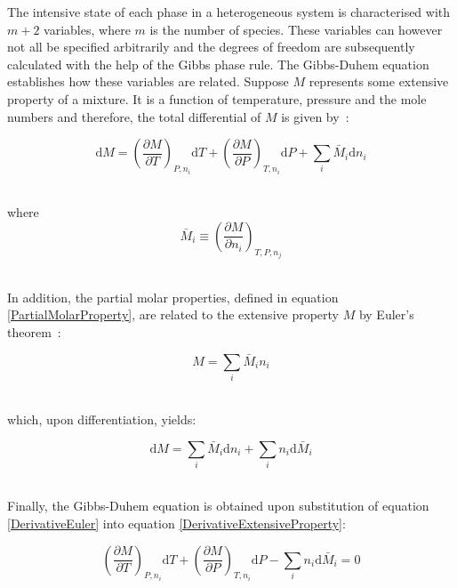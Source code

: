 The intensive state of each phase in a heterogeneous system is characterised with $m+2$ variables, where $m$ is the number of species. These variables can however not all be specified arbitrarily and the degrees of freedom are subsequently calculated with the help of the Gibbs phase rule. The Gibbs-Duhem equation establishes how these variables are related. Suppose $M$ represents some extensive property of a mixture. It is a function of temperature, pressure and the mole numbers and therefore, the total differential of $M$ is given by~\cite{MolecularThermodynamicsOfFluidPhaseEquilibria}:\

\begin{equation}
\mathrm{d}M = \left( \frac{\partial M}{\partial T}\right)_{P, n_{i}} \mathrm{d}T + \left( \frac{\partial M}{\partial P}\right)_{T, n_{i}} \mathrm{d}P + \sum_{i} \bar{M}_{i} \mathrm{d}n_{i} \label{DerivativeExtensiveProperty}
\end{equation}\

where\
\begin{equation}
\bar{M}_{i} \equiv \left(\frac{\partial M}{\partial n_{i}}\right)_{T, P, n_{j}} \label{PartialMolarProperty}
\end{equation}\


In addition, the partial molar properties, defined in equation \ref{PartialMolarProperty}, are related to the extensive property $M$ by Euler's theorem~\cite{MolecularThermodynamicsOfFluidPhaseEquilibria}:\

\begin{equation}
M = \sum_{i} \bar{M}_{i} n_{i} \label{Euler}
\end{equation}\

which, upon differentiation, yields:\

\begin{equation}
\mathrm{d}M = \sum_{i} \bar{M}_{i}\mathrm{d}n_{i} + \sum_{i} n_{i}\mathrm{d}\bar{M}_{i} \label{DerivativeEuler}
\end{equation}\

Finally, the Gibbs-Duhem equation is obtained upon substitution of equation \ref{DerivativeEuler} into equation \ref{DerivativeExtensiveProperty}:\

\begin{equation}
 \left( \frac{\partial M}{\partial T}\right)_{P, n_{i}} \mathrm{d}T + \left( \frac{\partial M}{\partial P}\right)_{T, n_{i}} \mathrm{d}P - \sum_{i} n_{i} \mathrm{d}\bar{M}_{i} = 0 \label{GibbsDuhem}
\end{equation}\

